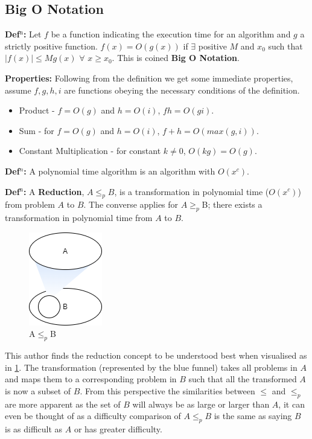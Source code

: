\documentclass[a4paper,11pt]{report}
\begin{document}
\subsection{Big O Notation}

\textbf{Def$^\text{n}$:} Let $f$ be a function indicating the execution time for an algorithm and $g$ a strictly positive function. $f(x)=O (g(x))$ if $\exists$ positive $ M$ and $x_0$ such that $|f(x)|\leq Mg(x)$ $\forall$ $x\geq x_0$. This is coined \textbf{Big O Notation}.

\textbf{Properties:} Following from the definition we get some immediate properties, assume $f,g,h,i$ are functions obeying the necessary conditions of the definition.
\begin{itemize}
\item Product - $f=O(g)$ and $h=O(i)$, $fh=O(gi)$.
\item Sum - for $f=O(g)$ and $h=O(i)$, $f+h = O(max(g,i))$.
\item Constant Multiplication - for constant $k\neq0$, $O(kg)=O(g)$.
\end{itemize}

\textbf{Def$^n$:} A polynomial time algorithm is an algorithm with $O(x^c)$.

\textbf{Def$^\text{n}$:} A \textbf{Reduction}, $A \leq_p B$, is a transformation in polynomial time ($O(x^c)$) from problem $A$ to $B$. The converse applies for $A\geq_p$B; there exists a transformation in polynomial time from $A$ to $B$.

\begin{figure}[h!]
	\begin{center}
		\includegraphics{figures/reduction.png}
	\end{center}
	\caption{\label{fig:reduction}A$\leq_p$B}
\end{figure}

This author finds the reduction concept to be understood best when visualised as in \ref{fig:reduction}. The transformation (represented by the blue funnel) takes all problems in $A$ and maps them to a corresponding problem in $B$ such that all the transformed $A$ is now a subset of $B$. From this perspective the similarities between $\leq$ and $\leq_p$ are more apparent as the set of $B$ will always be as large or larger than $A$, it can even be thought of as a difficulty comparison of $A\leq_p B$ is the same as saying $B$ is as difficult as $A$ or has greater difficulty.
\end{document}
